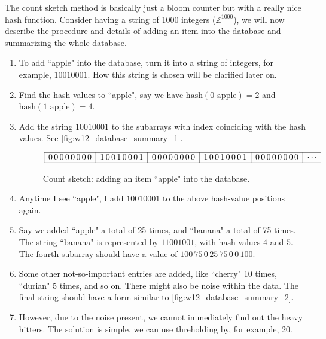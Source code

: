 The count sketch method is basically just a bloom counter but with a really nice hash function. Consider having a string of 1000 integers ($\mathbb{Z}^{1000}$), we will now describe the procedure and details of adding an item into the database and summarizing the whole database.
\begin{enumerate}[label=(\arabic*)]
    \item To add ``apple" into the database, turn it into a string of integers, for example, $10010001$. How this string is chosen will be clarified later on.
    \item Find the hash values to ``apple", say we have $\mathrm{hash}(0\text{ apple})=2$ and $\mathrm{hash}(1\text{ apple})=4$.
    \item Add the string $10010001$ to the subarrays with index coinciding with the hash values. See \autoref{fig:w12_database_summary_1}.
    \begin{figure}[H]
        \centering
        \begin{equation*}\begin{array}{|c|c|c|c|c|c}
            \hline
            0\,0\,0\,0\,0\,0\,0\,0 &
            1\,0\,0\,1\,0\,0\,0\,1 &
            0\,0\,0\,0\,0\,0\,0\,0 &
            1\,0\,0\,1\,0\,0\,0\,1 &
            0\,0\,0\,0\,0\,0\,0\,0 &
            \cdots \\
            \hline
        \end{array}\end{equation*}
        \caption{Count sketch: adding an item ``apple" into the database.}
        \label{fig:w12_database_summary_1}
    \end{figure}
    \item Anytime I see ``apple", I add $10010001$ to the above hash-value positions again.
    \item Say we added ``apple" a total of 25 times, and ``banana" a total of 75 times. The string ``banana" is represented by $11001001$, with hash values $4$ and $5$. The fourth subarray should have a value of $100\,75\,0\,25\,75\,0\,0\,100$.
    \item Some other not-so-important entries are added, like ``cherry" 10 times, ``durian" 5 times, and so on. There might also be noise within the data. The final string should have a form similar to \autoref{fig:w12_database_summary_2}.
    \item However, due to the noise present, we cannot immediately find out the heavy hitters. The solution is simple, we can use threholding by, for example, 20.
    \begin{figure}[H]

\end{figure}
\end{enumerate}
